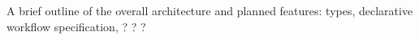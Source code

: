 
\label {fs-future-section}

A brief outline of the overall architecture and planned features: types, declarative workflow specification, ? ? ?